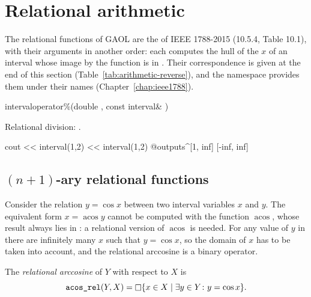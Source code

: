 \documentclass[12pt,a4paper,twoside,openright]{book}
\begin{document}
\section{Relational arithmetic}\label{sec:relational-arithmetic}
%
%

The relational functions of GAOL are the  of
IEEE 1788-2015 (10.5.4, Table 10.1), with their arguments in another order:
each computes the hull of the $x$ of an interval  whose image by the
function is in . Their correspondence is given at the end of this
section (Table~\ref{tab:arithmetic-reverse}), and the namespace
 provides them under their names
(Chapter~\ref{chap:ieee1788}).

\begin{deffun}{interval}{operator\%}{(double , const interval\& )}
  \begin{operation}
  \end{operation}
  Relational division: .
\begin{example}
cout << interval(1,2) %
     << interval(1,2) %
@outputs^[1, inf] [-inf, inf]~
\end{example}
\end{deffun}

\subsection{$(n+1)$-ary relational functions}\label{sec:arithmetic-nary}

Consider the relation $y=\cos x$ between two interval variables $x$ and $y$.
The equivalent form $x=\operatorname{acos}y$ cannot be computed with the
function $\operatorname{acos}$, whose result always lies in : a
relational version of $\operatorname{acos}$ is needed. For any value of $y$
in  there are infinitely many $x$ such that $y=\cos x$, so the
domain of $x$ has to be taken into account, and the relational arccosine is
a binary operator.

\begin{Def}\label{def:arithmetic-acos-rel}
The \emph{relational arccosine} of $Y$ with respect to $X$ is
\begin{equation*}
\texttt{acos\_rel}(Y,X)=\mathop{\Box} \{x\in X\mid\exists y\in Y\colon y=\cos x\}.
\end{equation*}
\end{Def}
\end{document}
